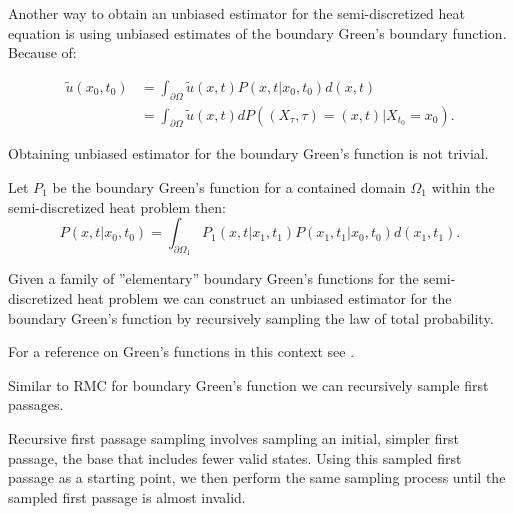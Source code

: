\documentclass[a4paper,12pt]{article}
\begin{document}
Another way to obtain an unbiased estimator for the semi-discretized heat equation is using unbiased estimates
of the boundary Green's boundary function. Because of:

\begin{align}
    \tilde{u}(x_{0},t_{0}) & = \int_{\partial \Omega} \tilde{u}(x,t) P(x,t|x_{0},t_{0}) d(x,t)                    \\
                           & = \int_{\partial \Omega} \tilde{u}(x,t)  dP((X_{\tau},\tau) = (x,t)| X_{t_0} = x_0 )
    .
\end{align}


Obtaining unbiased estimator for the boundary Green's function is not trivial.

\begin{lemma}
    Let $P_{1}$ be the boundary Green's function for a contained domain $\Omega_{1}$ within the semi-discretized heat problem
    then:
    \begin{equation}
        P(x,t|x_{0},t_{0})= \int_{\partial \Omega_{1}} P_{1}(x,t|x_{1},t_{1}) P(x_{1},t_{1}|x_{0},t_{0}) d(x_{1},t_{1})
        .
    \end{equation}
\end{lemma}

Given a family of ''elementary'' boundary Green's functions for the semi-discretized heat problem we can construct
an unbiased estimator for the boundary Green's function by recursively sampling the law of total probability. \\

\begin{related}
    For a reference on Green's functions in this context see \cite{qi_bidirectional_2022}.
\end{related}

Similar to RMC for boundary Green's function we can recursively sample first passages.

\begin{technique}
    Recursive first passage sampling involves sampling an initial,
    simpler first passage, the base that includes fewer valid states. Using
    this sampled first passage as a starting point, we
    then perform the same sampling process until the sampled
    first passage is almost invalid.
\end{technique}
\end{document}
